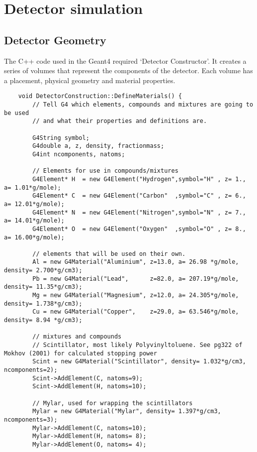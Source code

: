 \documentclass[]{article}
\begin{document}
\section{Detector simulation} %
\label{app:detector_simulation}
\subsection{Detector Geometry} %
\label{appsub:detector_geometry}
The C++ code used in the Geant4 required `Detector Constructor'. It creates a series of volumes that represent the components of the detector. Each volume has a placement, physical geometry and material properties.
 
\begin{verbatim}
    void DetectorConstruction::DefineMaterials() {
        // Tell G4 which elements, compounds and mixtures are going to be used
        // and what their properties and definitions are. 
        
        G4String symbol;        
        G4double a, z, density, fractionmass; 
        G4int ncomponents, natoms;
        
        // Elements for use in compounds/mixtures
        G4Element* H  = new G4Element("Hydrogen",symbol="H" , z= 1., a= 1.01*g/mole);
        G4Element* C  = new G4Element("Carbon"  ,symbol="C" , z= 6., a= 12.01*g/mole);
        G4Element* N  = new G4Element("Nitrogen",symbol="N" , z= 7., a= 14.01*g/mole);
        G4Element* O  = new G4Element("Oxygen"  ,symbol="O" , z= 8., a= 16.00*g/mole);
        
        // elements that will be used on their own.
        Al = new G4Material("Aluminium", z=13.0, a= 26.98 *g/mole, density= 2.700*g/cm3);
        Pb = new G4Material("Lead",      z=82.0, a= 207.19*g/mole, density= 11.35*g/cm3);
        Mg = new G4Material("Magnesium", z=12.0, a= 24.305*g/mole, density= 1.738*g/cm3);
        Cu = new G4Material("Copper",    z=29.0, a= 63.546*g/mole, density= 8.94 *g/cm3);
    
        // mixtures and compounds
        // Scintillator, most likely Polyvinyltoluene. See pg322 of Mokhov (2001) for calculated stopping power
        Scint = new G4Material("Scintillator", density= 1.032*g/cm3, ncomponents=2);
        Scint->AddElement(C, natoms=9);
        Scint->AddElement(H, natoms=10);
        
        // Mylar, used for wrapping the scintillators
        Mylar = new G4Material("Mylar", density= 1.397*g/cm3, ncomponents=3);
        Mylar->AddElement(C, natoms=10);
        Mylar->AddElement(H, natoms= 8);
        Mylar->AddElement(O, natoms= 4);
    

\end{verbatim}
\end{document}
